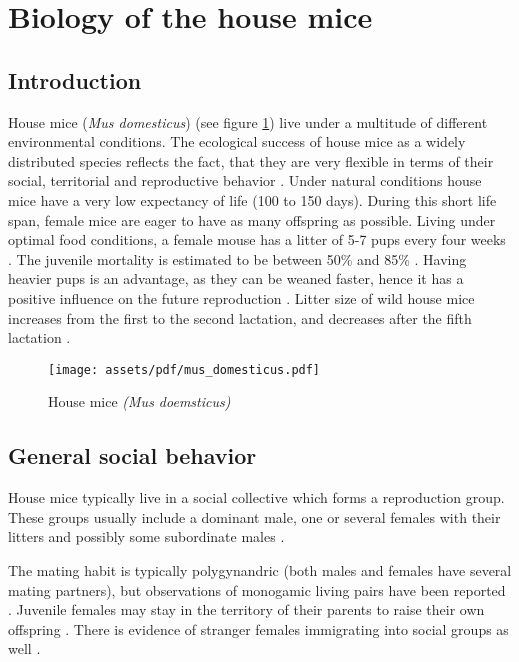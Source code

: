 \newpage
\section{Biology of the house mice}
\label{sec:biolhousemice}

\subsection{Introduction}
\label{subsec:introduction}

House mice (\textit{Mus domesticus}) (see figure \ref{fig:housemice}) live under a multitude of different environmental conditions. The ecological success of house mice as a widely distributed species reflects the fact, that they are very flexible in terms of their social, territorial and reproductive behavior \cite{bronson:79, bronson:84, berry:81}. Under natural conditions house mice have a very low expectancy of life (100 to 150 days). During this short life span, female mice are eager to have as many offspring as possible. Living under optimal food conditions, a female mouse has a litter of 5-7 pups every four weeks \cite{berry:71, pelikan:81}. The juvenile mortality is estimated to be between 50\% and 85\% \cite{berry:71, berry:75, pennycuik:86}. Having heavier pups is an advantage, as they can be weaned faster, hence it has a positive influence on the future reproduction \cite{fuchs:82}. Litter size of wild house mice increases from the first to the second lactation, and decreases after the fifth lactation \cite{pelikan:81, koenig:87b}. 

\begin{figure}[htbp]	
\centering	
\texttt{[image: assets/pdf/mus\_domesticus.pdf]}	
\caption[House mice]{House mice \textit{(Mus doemsticus)}}
\label{fig:housemice}
\end{figure}

\subsection{General social behavior}
\label{subsec:socialbehaviour}
House mice typically live in a social collective which forms a reproduction group. These groups usually include a dominant male, one or several females with their litters and possibly some subordinate males \cite{crowcroft:63, reimer:67, selander:70, mackintosh:81}.

The mating habit is typically polygynandric (both males and females have several mating partners), but observations of monogamic living pairs have been reported \cite{lidicker:76}. Juvenile females may stay in the territory of their parents to raise their own offspring \cite{petras:67}. There is evidence of stranger females immigrating into social groups as well \cite{anderson:65, reimer:67, selander:70, bronson:79, baker:81}.     

